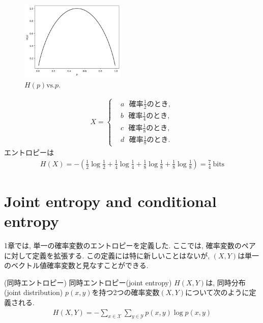 \documentclass[a4j]{jsarticle}
\begin{document}
\begin{figure}[H]
	\centering
	\includegraphics[width = 5.0cm]{entropy.png}
	\caption{$H(p) \mbox{vs.} p.$}
	\label{fig:entropy}
\end{figure}


\begin{align}
	X = \begin{cases}
		 & a\:\:\:\mbox{確率}\frac{1}{2}\mbox{のとき}, \\
		 & b\:\:\:\mbox{確率}\frac{1}{4}\mbox{のとき}, \\
		 & c\:\:\:\mbox{確率}\frac{1}{8}\mbox{のとき}, \\
		 & d\:\:\:\mbox{確率}\frac{1}{8}\mbox{のとき}.
	\end{cases}
\end{align}
エントロピーは
\begin{align}
	H(X) = - \left( \frac{1}{2} \log \frac{1}{2} + \frac{1}{4} \log \frac{1}{4} + \frac{1}{8} \log \frac{1}{8} + \frac{1}{8} \log \frac{1}{8} \right) = \frac{7}{4} \: \mbox{bits}
\end{align}

\section{Joint entropy and conditional entropy}

1章では, 単一の確率変数のエントロピーを定義した. ここでは, 確率変数のペアに対して定義を拡張する. この定義には特に新しいことはないが, $(X, Y)$は単一のベクトル値確率変数と見なすことができる.\\

\begin{itembox}[l]{ (同時エントロピー)}
	同時エントロピー(joint entropy) $H(X, Y)$は, 同時分布(joint distribution) $p(x, y)$を持つ2つの確率変数$(X, Y)$について次のように定義される.
	\begin{align}
		H(X, Y) = - \sum_{x \in \mathcal{X}} \sum_{y \in \mathcal{Y}} p(x, y) \log p(x, y)
	\end{align}
\end{itembox}\\
\end{document}
